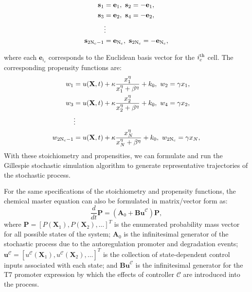 \documentclass[12pt]{article}
\begin{document}
\begin{align}
\mathbf{s}_1 &= \mathbf{e}_1,\ \mathbf{s}_2 = -\mathbf{e}_1,\nonumber\\ 
\mathbf{s}_3 &= \mathbf{e}_2,\ \mathbf{s}_4 = -\mathbf{e}_2,\nonumber\\
&\vdots \nonumber\\ 
\mathbf{s}_{\rm 2N_c-1} &= \mathbf{e}_{\rm N_c},\ \mathbf{s}_{\rm 2N_c} = -\mathbf{e}_{\rm N_c}, \label{Stochs}
 \end{align}
 
 
where each $\mathbf{e}_{i_c}$ corresponds to the Euclidean basis vector for the $i_c^{\rm th}$ cell. The corresponding propensity functions are:
\begin{align}
w_1 &= u(\mathbf{X},t)  + \kappa \frac{x_1^\eta}{x_1^{\eta}+\beta^{\eta}} + k_0,\ w_2 = \gamma x_1,\nonumber\\
w_3 &= u(\mathbf{X},t)  + \kappa \frac{x_2^\eta}{x_2^{\eta}+\beta^{\eta}} + k_0,\ w_4 = \gamma x_2,\nonumber\\
&\vdots \nonumber\\
w_{\rm 2N_c-1} &= u(\mathbf{X},t)  + \kappa \frac{x_N^\eta}{x_N^{\eta}+\beta^{\eta}} + k_0,\ w_{\rm 2N_c} = \gamma x_N,\label{Props}
 \end{align}
With these stoichiometry and propensities, we can formulate and run the Gillespie stochastic simulation algorithm\cite{Gillespie1992,Gillespie1977} to generate representative trajectories of the stochastic process.

For the same specifications of the stoichiometry and propensity functions, the chemical master equation can also be formulated in matrix/vector form as:
\begin{equation}
\frac{d}{dt}\mathbf{P}=(\mathbf{A}_0+\textbf{Bu}^{\mathcal{C}})\mathbf{P},\label{CME}
\end{equation}
where $\mathbf{P} = [P(\mathbf{X}_1), P(\mathbf{X}_2), \ldots ]^T$ is the enumerated probability mass vector for all possible states of the system; $\mathbf{A}_0$ is the infinitesimal generator of the stochastic process due to the autoregulation promoter and degradation events;  $\textbf{u}^{\mathcal{C}} =[u^{\mathcal{C}}(\mathbf{X}_1), u^{\mathcal{C}}(\mathbf{X}_2), \ldots ]^T$ is the collection of state-dependent control inputs associated with each state; and $\textbf{Bu}^{\mathcal{C}}$ is the infinitesimal generator for the T7 promoter expression by which the effects of controller $\mathcal{C}$ are introduced into the process. 
\end{document}
